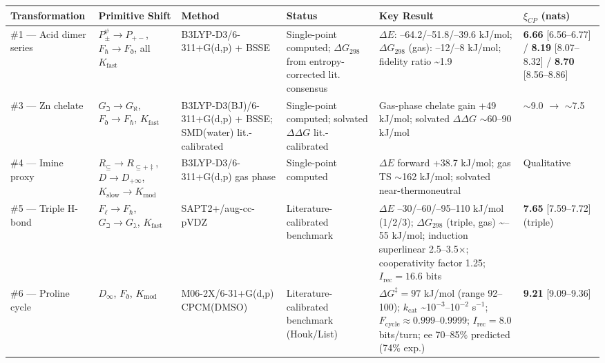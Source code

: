 \documentclass[12pt,a4paper]{article}
\begin{document}
\begin{table}[htbp]
\centering
\small
{}
\begin{tabularx}{\textwidth}{>{\centering\arraybackslash}X >{\centering\arraybackslash}X >{\centering\arraybackslash}X >{\centering\arraybackslash}X >{\centering\arraybackslash}X >{\centering\arraybackslash}X}
\toprule
\rowcolor{gray!25}\textbf{Transformation} & \textbf{Primitive Shift} & \textbf{Method} & \textbf{Status} & \textbf{Key Result} & \textbf{$\xi_{CP}$ (nats)} \\
\midrule
\rowcolors{1}{white}{gray!10}
\#1 --- Acid dimer series & $P_{\pm}^{\psi} \to P_{+-}$, $F_{\hbar} \to F_{\eth}$, all $K_{\text{fast}}$ & B3LYP-D3/6-311+G(d,p) + BSSE & Single-point computed; $\Delta G_{298}$ from entropy-corrected lit. consensus & $\Delta E$: --64.2/--51.8/--39.6 kJ/mol; $\Delta G_{298}$ (gas): --12/--8 kJ/mol; fidelity ratio \textasciitilde{}1.9 & \textbf{6.66} {[}6.56--6.77{]} / \textbf{8.19} {[}8.07--8.32{]} / \textbf{8.70} {[}8.56--8.86{]} \\
\#3 --- Zn chelate & $G_{\beth} \to G_{\aleph}$, $F_{\eth} \to F_{\hbar}$, $K_{\text{fast}}$ & B3LYP-D3(BJ)/6-311+G(d,p) + BSSE; SMD(water) lit.-calibrated & Single-point computed; solvated $\Delta\Delta G$ lit.-calibrated & Gas-phase chelate gain +49 kJ/mol; solvated $\Delta\Delta G$ $\sim$60--90 kJ/mol & $\sim$9.0 $\to$ $\sim$7.5 \\
\#4 --- Imine proxy & $R_{\subseteq} \to R_{\subseteq+\ddagger}$, $D \to D_{+\infty}$, $K_{\text{slow}} \to K_{\text{mod}}$ & B3LYP-D3/6-311+G(d,p) gas phase & Single-point computed & $\Delta E$ forward +38.7 kJ/mol; gas TS $\sim$162 kJ/mol; solvated near-thermoneutral & Qualitative \\
\#5 --- Triple H-bond & $F_{\ell} \to F_{\hbar}$, $G_{\beth} \to G_{\gimel}$, $K_{\text{fast}}$ & SAPT2+/aug-cc-pVDZ & Literature-calibrated benchmark & $\Delta E$ --30/--60/--95--110 kJ/mol (1/2/3); $\Delta G_{298}$ (triple, gas) \textasciitilde{}--55 kJ/mol; induction superlinear 2.5--3.5$\times$; cooperativity factor 1.25; $I_{\text{rec}} = 16.6$ bits & \textbf{7.65} {[}7.59--7.72{]} (triple) \\
\#6 --- Proline cycle & $D_{\infty}$, $F_{\eth}$, $K_{\text{mod}}$ & M06-2X/6-31+G(d,p) CPCM(DMSO) & Literature-calibrated benchmark (Houk/List) & $\Delta G^{\ddagger} = 97$ kJ/mol (range 92--100); $k_{\text{cat}}$ \textasciitilde{}10$^{-3}$--10$^{-2}$ s$^{-1}$; $F_{\text{cycle}} \approx 0.999$--0.9999; $I_{\text{rec}} = 8.0$ bits/turn; ee 70--85\% predicted (74\% exp.) & \textbf{9.21} {[}9.09--9.36{]} \\

\end{tabularx}
\end{table}
\end{document}
